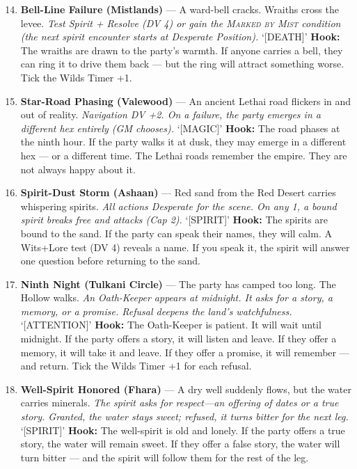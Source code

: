 \begin{enumerate}
\setcounter{enumi}{13}
\item \textbf{Bell-Line Failure (Mistlands)} --- A ward-bell cracks. Wraiths cross the levee.
  \hfill \textit{Test Spirit + Resolve (DV 4) or gain the \textsc{Marked by Mist} condition (the next spirit encounter starts at Desperate Position).} `[DEATH]'
  \textbf{Hook:} The wraiths are drawn to the party's warmth. If anyone carries a bell, they can ring it to drive them back --- but the ring will attract something worse. Tick the Wilds Timer +1.
  
\item \textbf{Star-Road Phasing (Valewood)} --- An ancient Lethai road flickers in and out of reality.
  \hfill \textit{Navigation DV +2. On a failure, the party emerges in a different hex entirely (GM chooses).} `[MAGIC]'
  \textbf{Hook:} The road phases at the ninth hour. If the party walks it at dusk, they may emerge in a different hex --- or a different time. The Lethai roads remember the empire. They are not always happy about it.
  
\item \textbf{Spirit-Dust Storm (Ashaan)} --- Red sand from the Red Desert carries whispering spirits.
  \hfill \textit{All actions Desperate for the scene. On any 1, a bound spirit breaks free and attacks (Cap 2).} `[SPIRIT]'
  \textbf{Hook:} The spirits are bound to the sand. If the party can speak their names, they will calm. A Wits+Lore test (DV 4) reveals a name. If you speak it, the spirit will answer one question before returning to the sand.
  
\item \textbf{Ninth Night (Tulkani Circle)} --- The party has camped too long. The Hollow walks.
  \hfill \textit{An Oath-Keeper appears at midnight. It asks for a story, a memory, or a promise. Refusal deepens the land's watchfulness.} `[ATTENTION]'
  \textbf{Hook:} The Oath-Keeper is patient. It will wait until midnight. If the party offers a story, it will listen and leave. If they offer a memory, it will take it and leave. If they offer a promise, it will remember --- and return. Tick the Wilds Timer +1 for each refusal.
  
\item \textbf{Well-Spirit Honored (Fhara)} --- A dry well suddenly flows, but the water carries minerals.
  \hfill \textit{The spirit asks for respect---an offering of dates or a true story. Granted, the water stays sweet; refused, it turns bitter for the next leg.} `[SPIRIT]'
  \textbf{Hook:} The well-spirit is old and lonely. If the party offers a true story, the water will remain sweet. If they offer a false story, the water will turn bitter --- and the spirit will follow them for the rest of the leg.
  

\end{enumerate}
